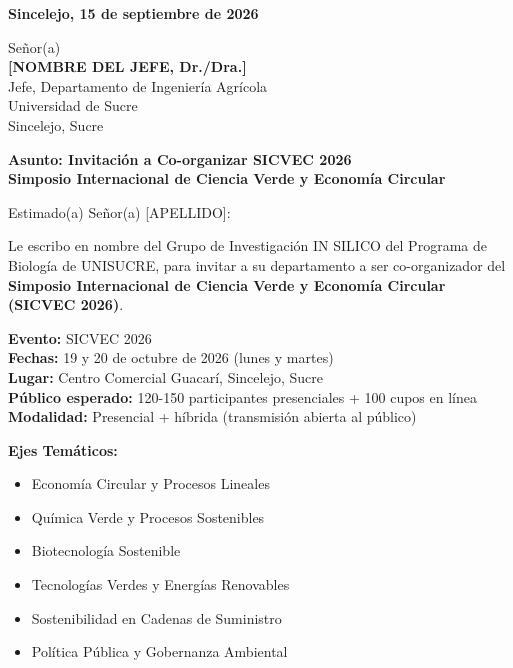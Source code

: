 \documentclass[12pt,a4paper]{article}
\begin{document}
\vspace{1cm}

\noindent
\textbf{Sincelejo, 15 de septiembre de 2026}

\vspace{1.5cm}

\noindent
Señor(a)\\
\textbf{[NOMBRE DEL JEFE, Dr./Dra.]}\\
Jefe, Departamento de Ingeniería Agrícola\\
Universidad de Sucre\\
Sincelejo, Sucre

\vspace{1.5cm}

\noindent
\textbf{\large Asunto: Invitación a Co-organizar SICVEC 2026}\\
\textbf{\large Simposio Internacional de Ciencia Verde y Economía Circular}

\vspace{1.5cm}

Estimado(a) Señor(a) [APELLIDO]:

\vspace{0.8cm}

Le escribo en nombre del Grupo de Investigación IN SILICO del Programa de Biología de UNISUCRE, para invitar a su departamento a ser co-organizador del \textbf{Simposio Internacional de Ciencia Verde y Economía Circular (SICVEC 2026)}.

\vspace{0.8cm}

\textbf{Evento:} SICVEC 2026\\
\textbf{Fechas:} 19 y 20 de octubre de 2026 (lunes y martes)\\
\textbf{Lugar:} Centro Comercial Guacarí, Sincelejo, Sucre\\
\textbf{Público esperado:} 120-150 participantes presenciales + 100 cupos en línea\\
\textbf{Modalidad:} Presencial + híbrida (transmisión abierta al público)

\vspace{1cm}

\textbf{Ejes Temáticos:}
\begin{itemize}
  \item Economía Circular y Procesos Lineales
  \item Química Verde y Procesos Sostenibles
  \item Biotecnología Sostenible
  \item Tecnologías Verdes y Energías Renovables
  \item Sostenibilidad en Cadenas de Suministro
  \item Política Pública y Gobernanza Ambiental
\end{itemize}
\end{document}
